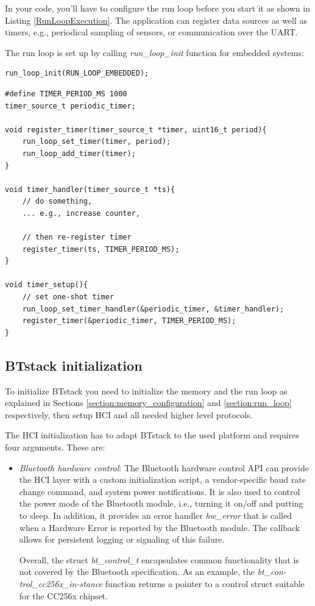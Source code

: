 \documentclass[a4paper,titlepage,oneside,12pt]{amsart} %
\begin{document}
In your code, you'll have to configure the run loop before you start it as shown in Listing \ref{RunLoopExecution}. The application can register data sources as well as timers, e.g., periodical sampling of sensors, or communication over the UART.

The run loop is set up by calling \emph{run\_loop\_init} function for embedded systems:
\begin{lstlisting}
run_loop_init(RUN_LOOP_EMBEDDED);
\end{lstlisting}


\begin{lstlisting}[float, caption=Periodic counter, label=PeriodicTimerHandler]
#define TIMER_PERIOD_MS 1000
timer_source_t periodic_timer;

void register_timer(timer_source_t *timer, uint16_t period){
    run_loop_set_timer(timer, period);
    run_loop_add_timer(timer);
}

void timer_handler(timer_source_t *ts){
    // do something,
    ... e.g., increase counter,
    
    // then re-register timer
    register_timer(ts, TIMER_PERIOD_MS);
} 

void timer_setup(){
    // set one-shot timer
    run_loop_set_timer_handler(&periodic_timer, &timer_handler);
    register_timer(&periodic_timer, TIMER_PERIOD_MS);
}
\end{lstlisting}

\subsection{BTstack initialization}
\label{section:btstack_initialization}
To initialize BTstack you need to initialize the memory and the run loop as explained in Sections \ref{section:memory_configuration} and \ref{section:run_loop} respectively, then setup HCI and all needed higher level protocols.

The HCI initialization has to adapt BTstack to the used platform and requires four arguments. These are:
\begin{itemize}
\item \emph{Bluetooth hardware control}: The Bluetooth hardware control API can provide the HCI layer with a custom initialization script, a vendor-specific baud rate change command, and system power notifications. It is also used to control the power mode of the Bluetooth module, i.e., turning it on/off and putting to sleep. In addition, it provides an error handler \emph{hw\_error} that is called when a Hardware Error is reported by the Bluetooth module. The callback allows for persistent logging or signaling of this failure. 

Overall, the struct \emph{bt\_control\_t} encapsulates common functionality that is not covered by the Bluetooth specification. As an example, the \emph{bt\_con-trol\_cc256x\_in-stance} function returns a pointer to a control struct suitable for the CC256x chipset.
\end{itemize}
\end{document}
